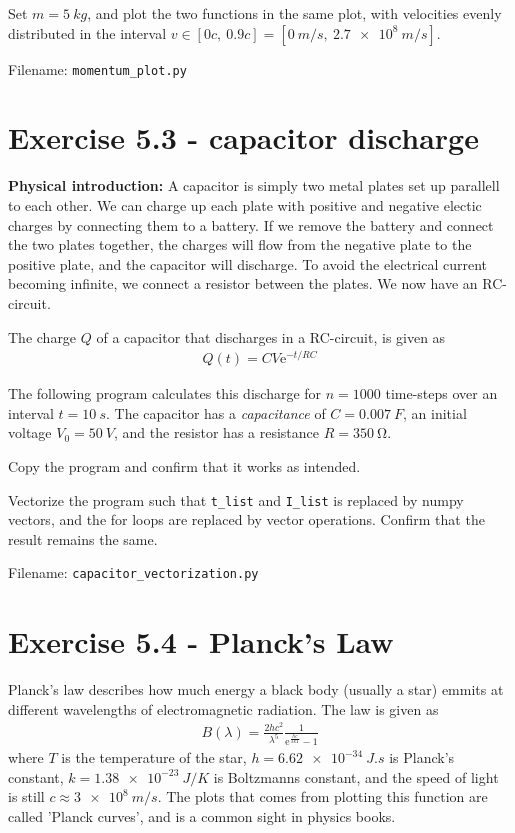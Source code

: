\documentclass[10pt,a4paper]{article}
\renewcommand{\exp}{\mathrm{e}^}
\begin{document}
Set $m = \SI{5}{kg}$, and plot the two functions in the same plot, with velocities evenly distributed in the interval $v \in [0c,\ 0.9c] = [\SI{0}{m/s},\ \SI{2.7e8}{m/s}]$.

Filename: \texttt{momentum\_plot.py}


\section*{Exercise 5.3 - capacitor discharge}
\textbf{Physical introduction:} A capacitor is simply two metal plates set up parallell to each other. We can charge up each plate with positive and negative electic charges by connecting them to a battery. If we remove the battery and connect the two plates together, the charges will flow from the negative plate to the positive plate, and the capacitor will discharge. To avoid the electrical current becoming infinite, we connect a resistor between the plates. We now have an RC-circuit.

The charge $Q$ of a capacitor that discharges in a RC-circuit, is given as
\begin{align*}
Q(t) = CV\exp{-t/RC}
\end{align*}

The following program calculates this discharge for $n=1000$ time-steps over an interval $t = \SI{10}{s}$. The capacitor has a \textit{capacitance} of $C = \SI{0.007}{F}$, an initial voltage $V_0 = \SI{50}{V}$, and the resistor has a resistance $R = \SI{350}{\ohm}$.



Copy the program and confirm that it works as intended.

Vectorize the program such that \texttt{t\_list} and \texttt{I\_list} is replaced by numpy vectors, and the for loops are replaced by vector operations. Confirm that the result remains the same.

Filename: \texttt{capacitor\_vectorization.py}


\section*{Exercise 5.4 - Planck's Law}

Planck's law describes how much energy a black body (usually a star) emmits at different wavelengths of electromagnetic radiation. The law is given as
\begin{align*}
B(\lambda) = \frac{2hc^2}{\lambda^5}\frac{1}{\exp{\frac{hc}{\lambda k T}}-1}
\end{align*}
where $T$ is the temperature of the star, $h = \SI{6.62e-34}{J.s}$ is Planck's constant, $k = \SI{1.38e-23}{J/K}$ is Boltzmanns constant, and the speed of light is still $c \approx \SI{3e8}{m/s}$. The plots that comes from plotting this function are called 'Planck curves', and is a common sight in physics books.
\end{document}
